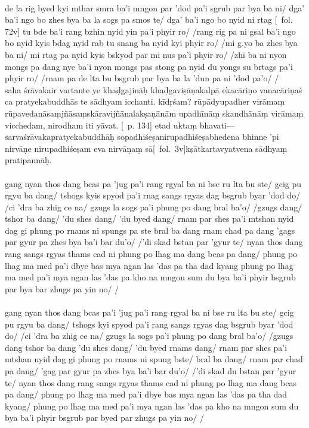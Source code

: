 \documentclass[12pt]{article}
\newcommand{\emdash} {\hspace{0em}—\hspace{0em}}
\begin{document}
\textbf{\TVB}\\
de la rig byed kyi mthar smra ba'i mngon par 'dod pa'i sgrub par bya ba ni/ dga' ba'i ngo bo zhes bya ba la sogs pa smos te/ dga' ba'i ngo bo nyid ni rtag [\TVB\ fol. 72v] tu bde ba'i rang bzhin nyid yin pa'i phyir ro/ /rang rig pa ni gsal ba'i ngo bo nyid kyis bdag nyid rab tu snang ba nyid kyi phyir ro/ /mi g.yo ba zhes bya ba ni/ mi rtag pa nyid kyis bskyod par mi nus pa'i phyir ro/ /zhi ba ni nyon mongs pa dang nye ba'i nyon mongs pas stong pa nyid du yongs su brtags pa'i phyir ro/ /rnam pa de lta bu bsgrub par bya ba la 'dun pa ni 'dod pa'o/ /\\

saha śrāvakair vartante ye khaḍgajināḥ khaḍgaviṣāṇakalpā ekacāriṇo vanacāriṇaś\footnoteB{
	vanacāriṇaś] \EDD; emend to vargacāriṇaś (cf.\ Abhidharmakośabhāṣya)
} ca pratyekabuddhās te sādhyam icchanti.
kīdṛśam?
rūpādyupadher virāmaṃ rūpavedanāsaṃjñāsaṃskāravijñānalakṣaṇānām upadhīnāṃ skandhānāṃ virāmaṃ vicchedam, nirodham iti yāvat.
[\EDD\ p. 134] etad uktaṃ bhavati\emdash sarvaśrāvakapratyekabuddhāḥ sopadhiśeṣanirupadhiśeṣabhedena bhinne 'pi nirvāṇe nirupadhiśeṣam eva nirvāṇaṃ sā[\MS\ fol.\ 3v]kṣātkartavyatvena sādhyaṃ pratipannāḥ.\\

\textbf{\TVA}\\
gang nyan thos dang bcas pa 'jug pa'i rang rgyal ba ni bse ru lta bu ste/ gcig pu rgyu ba dang/ tshogs kyis spyod pa'i rnag sangs rgyas dag bsgrub byar 'dod do/ /ci 'dra ba zhig ce na/ gzugs la sogs pa'i phung po dang bral ba'o/ /gzugs dang/ tshor ba dang/ 'du shes dang/ 'du byed dang/ rnam par shes pa'i mtshan nyid dag gi phung po rnams ni spungs pa ste bral ba dang rnam chad pa dang 'gags par gyur pa zhes bya ba'i bar du'o/ /'di skad bstan par 'gyur te/ nyan thos dang rang sangs rgyas thams cad ni phung po lhag ma dang bcas pa dang/ phung po lhag ma med pa'i dbye bas mya ngan las 'das pa tha dad kyang phung po lhag ma med pa'i mya ngan las 'das pa kho na mngon sum du bya ba'i phyir bsgrub par bya bar zhugs pa yin no/ /\\

\textbf{\TVB}\\
gang nyan thos dang bcas pa'i 'jug pa'i rang rgyal ba ni bse ru lta bu ste/ gcig pu rgyu ba dang/ tshogs kyi spyod pa'i rang sangs rgyas dag bsgrub byar 'dod do/ /ci 'dra ba zhig ce na/ gzugs la sogs pa'i phung po dang bral ba'o/ /gzugs dang tshor ba dang 'du shes dang/ 'du byed rnams dang/ rnam par shes pa'i mtshan nyid dag gi phung po rnams ni spung bste/ bral ba dang/ rnam par chad pa dang/ 'gag par gyur pa zhes bya ba'i bar du'o/ /'di skad du bstan par 'gyur te/ nyan thos dang rang sangs rgyas thams cad ni phung po lhag ma dang bcas pa dang/ phung po lhag ma med pa'i dbye bas mya ngan las 'das pa tha dad kyang/ phung po lhag ma med pa'i mya ngan las 'das pa kho na mngon sum du bya ba'i phyir bsgrub par byed par zhugs pa yin no/ /
\end{document}
